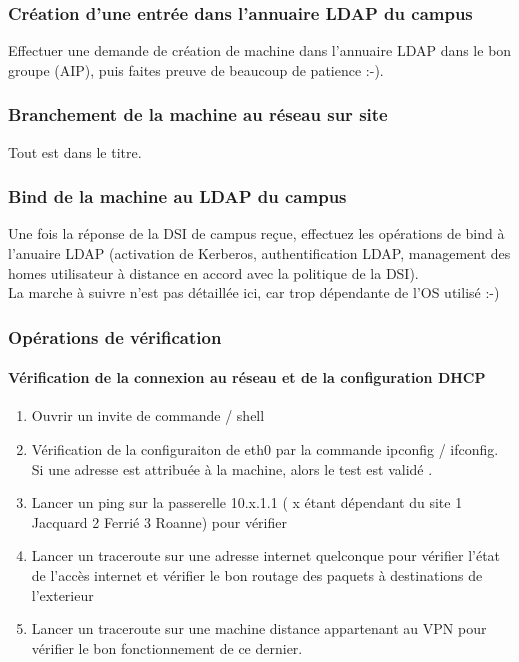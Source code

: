 \documentclass[a4paper]{article}
\begin{document}
\subsubsection{Création d'une entrée dans l'annuaire LDAP du campus}

Effectuer une demande de création de machine dans l'annuaire LDAP dans le bon groupe (AIP), puis faites preuve de beaucoup de patience :-).

\subsubsection{Branchement de la machine au réseau sur site}
Tout est dans le titre.

\subsubsection{Bind de la machine au LDAP du campus}

Une fois la réponse de la DSI de campus reçue, effectuez les opérations de bind à l'anuaire LDAP  (activation de Kerberos, authentification LDAP, management des homes utilisateur à distance en accord avec la politique de la DSI).\\
La marche à suivre n'est pas détaillée ici, car trop dépendante de l'OS utilisé :-)

\subsubsection{Opérations de vérification}

\paragraph{Vérification de la connexion au réseau et de la configuration DHCP}

\begin{enumerate}
\item Ouvrir un invite de commande / shell
\item Vérification de la configuraiton de eth0 par la commande ipconfig / ifconfig. Si une adresse est attribuée à  la machine, alors le test est validé . 
\item Lancer un ping sur la passerelle 10.x.1.1 ( x étant dépendant du site 1 Jacquard 2 Ferrié 3 Roanne) pour vérifier 
\item Lancer un traceroute sur une adresse internet quelconque pour vérifier l'état de l'accès internet et vérifier le bon routage des paquets à destinations de l'exterieur
\item Lancer un traceroute sur une machine distance appartenant au VPN pour vérifier le bon fonctionnement de ce dernier.
\end{enumerate}
\end{document}
